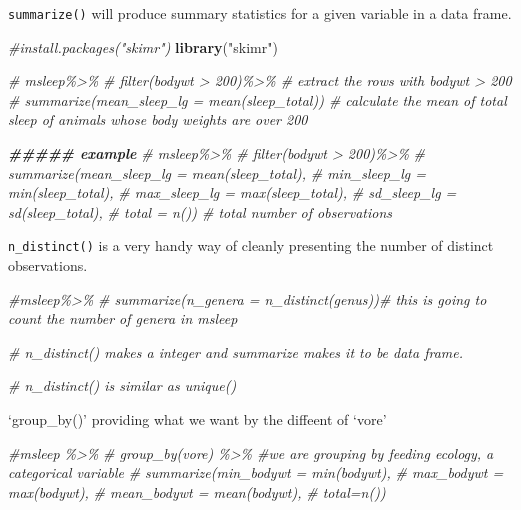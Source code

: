\documentclass[
]{article}
\newenvironment{Shaded}{\begin{snugshade}}{\end{snugshade}}
\newcommand{\CommentTok}[1]{\textcolor[rgb]{0.56,0.35,0.01}{\textit{#1}}}
\newcommand{\DocumentationTok}[1]{\textcolor[rgb]{0.56,0.35,0.01}{\textbf{\textit{#1}}}}
\newcommand{\FunctionTok}[1]{\textcolor[rgb]{0.13,0.29,0.53}{\textbf{#1}}}
\newcommand{\NormalTok}[1]{#1}
\newcommand{\StringTok}[1]{\textcolor[rgb]{0.31,0.60,0.02}{#1}}
\begin{document}
\texttt{summarize()} will produce summary statistics for a given
variable in a data frame.

\begin{Shaded}
\begin{Highlighting}[]
\CommentTok{\#install.packages("skimr")}
\FunctionTok{library}\NormalTok{(}\StringTok{"skimr"}\NormalTok{)}

\CommentTok{\# msleep\%\textgreater{}\%}
\CommentTok{\#  filter(bodywt \textgreater{} 200)\%\textgreater{}\% \# extract the rows with bodywt \textgreater{} 200}
\CommentTok{\#  summarize(mean\_sleep\_lg = mean(sleep\_total)) \# calculate the mean of total sleep of animals whose body weights are over 200}


\DocumentationTok{\#\#\#\#\# example}
\CommentTok{\# msleep\%\textgreater{}\%}
\CommentTok{\#  filter(bodywt \textgreater{} 200)\%\textgreater{}\%}
\CommentTok{\#  summarize(mean\_sleep\_lg = mean(sleep\_total),}
\CommentTok{\#            min\_sleep\_lg = min(sleep\_total),}
\CommentTok{\#            max\_sleep\_lg = max(sleep\_total),}
\CommentTok{\#            sd\_sleep\_lg = sd(sleep\_total),}
\CommentTok{\#            total = n()) \# total number of observations}
\end{Highlighting}
\end{Shaded}

\texttt{n\_distinct()} is a very handy way of cleanly presenting the
number of distinct observations.

\begin{Shaded}
\begin{Highlighting}[]
\CommentTok{\#msleep\%\textgreater{}\%}
\CommentTok{\#  summarize(n\_genera = n\_distinct(genus))\# this is going to count the number of genera in msleep}


\CommentTok{\# n\_distinct() makes a integer and summarize makes it to be data frame.}

\CommentTok{\# n\_distinct() is similar as unique() }
\end{Highlighting}
\end{Shaded}

`group\_by()' providing what we want by the diffeent of `vore'

\begin{Shaded}
\begin{Highlighting}[]
\CommentTok{\#msleep \%\textgreater{}\%}
\CommentTok{\#  group\_by(vore) \%\textgreater{}\% \#we are grouping by feeding ecology, a categorical variable}
\CommentTok{\#  summarize(min\_bodywt = min(bodywt),}
\CommentTok{\#           max\_bodywt = max(bodywt),}
\CommentTok{\#            mean\_bodywt = mean(bodywt),}
\CommentTok{\#           total=n())}
\end{Highlighting}
\end{Shaded}
\end{document}
